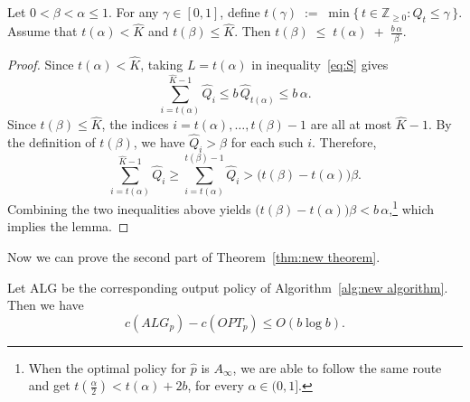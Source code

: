 \begin{lemma}
    \label{lm:distance jump from tail alpha to tail beta}
    Let $0<\beta<\alpha\le 1$. For any $\gamma\in[0,1]$, define
    $t(\gamma)\;:=\;\min\{\,t\in\mathbb{Z}_{\ge 0} : \hat Q_t \le \gamma\,\}$.
    Assume that $t(\alpha)<\hat K$ and $t(\beta)\le \hat K$. Then
    $t(\beta)\;\le\; t(\alpha)\;+\;\frac{b\,\alpha}{\beta}$.
\end{lemma}

\begin{proof}
    Since $t(\alpha)<\hat K$, taking $L=t(\alpha)$ in inequality~\eqref{eq:S} gives
    \[\sum_{i=t(\alpha)}^{\hat K-1} \hat Q_i \le b\,\hat Q_{t(\alpha)} \le b\,\alpha.\]
    Since $t(\beta)\le \hat K$, the indices $i=t(\alpha),\dots,t(\beta)-1$ are all at most $\hat K-1$.
    By the definition of $t(\beta)$, we have $\hat Q_i>\beta$ for each such $i$.
    Therefore,
    \[\sum_{i=t(\alpha)}^{\hat K-1} \hat Q_i \ge \sum_{i=t(\alpha)}^{t(\beta)-1} \hat Q_i > \bigl(t(\beta)-t(\alpha)\bigr)\beta. \]
    Combining the two inequalities above yields $\bigl(t(\beta)-t(\alpha)\bigr)\beta < b\,\alpha$,\footnote{When the optimal policy for $\hat{p}$ is $A_\infty$, we are able to follow the same route and get $t(\frac{\alpha}{2})<t(\alpha)+2b$, for every $\alpha \in (0,1]$.} which implies the lemma.
\end{proof}

Now we can prove the second part of Theorem~\ref{thm:new theorem}.

\begin{thm}
    \label{thm: b logb bound for new algorithm}
    Let ALG be the corresponding output policy of Algorithm~\ref{alg:new algorithm}. Then we have
    \[c(ALG_p) - c(OPT_p) \leq O(b \log b).\]
\end{thm}

